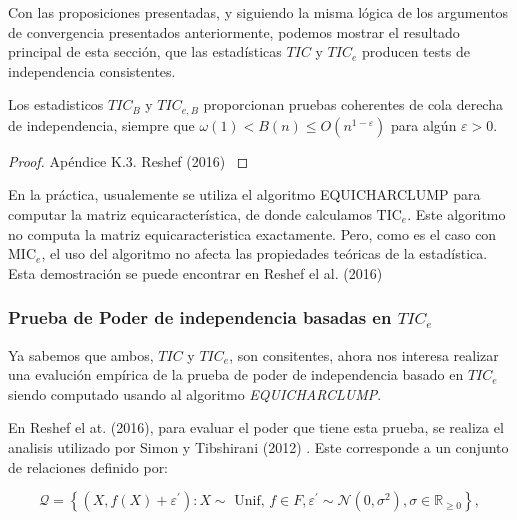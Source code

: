 \begin{defn}
            Con las proposiciones presentadas, y siguiendo la misma l\'ogica de los argumentos de convergencia presentados anteriormente, podemos mostrar el resultado principal de esta secci\'on, que las estad\'isticas $TIC$ y $TIC_e$ producen tests de independencia consistentes.
    
            \begin{thm}
                Los estadisticos $T I C_B$ y $T I C_{e, B}$ proporcionan pruebas coherentes de cola derecha de independencia, siempre que $\omega(1)<B(n) \leq O\left(n^{1-\varepsilon}\right)$ para alg\'un $\varepsilon>0$.
            \end{thm}
            \begin{proof}
                Ap\'endice K.3. Reshef (2016) \cite{Reshef2016}
            \end{proof}
    
            En la pr\'actica, usualemente se utiliza el algoritmo  EQUICHARCLUMP \cite[Secci\'on 4.3]{Reshef2016} para computar la matriz equicaracter\'istica, de donde calculamos $\mathrm{TIC}_e$. Este algoritmo no computa la matriz equicaracteristica exactamente. Pero, como es el caso con $\mathrm{MIC}_e$, el uso del algoritmo no afecta las propiedades te\'oricas de la estad\'istica. Esta demostraci\'on se puede encontrar en Reshef el al. (2016) \cite[Ap\'endice H]{Reshef2016}
        \end{defn}
    
        \subsubsection[poder de independencia basado en TICe]{Prueba de Poder de independencia basadas en $TIC_e$}
    
        Ya sabemos que ambos, $TIC$ y $TIC_e$, son consitentes, ahora nos interesa realizar una evaluci\'on emp\'irica de la prueba de poder de independencia basado en $TIC_e$	siendo computado usando al algoritmo \textit{EQUICHARCLUMP}.
    
        En Reshef el at. (2016)\cite{Reshef2016}, para evaluar el poder que tiene esta prueba, se realiza el analisis utilizado por Simon y Tibshirani (2012) \cite{SimonTibshirani}. Este corresponde a un conjunto de relaciones definido por:
    
        $$
        \mathcal{Q}=\left\{\left(X, f(X)+\varepsilon^{\prime}\right): X \sim \text { Unif, } f \in F, \varepsilon^{\prime} \sim \mathcal{N}\left(0, \sigma^2\right), \sigma \in \mathbb{R}_{\geq 0}\right\},
        $$
        
